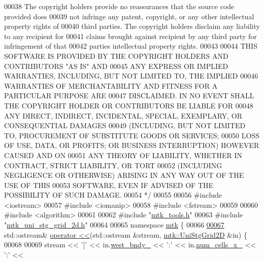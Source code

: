 \begin{DoxyCode}
00038 \textcolor{comment}{The copyright holders provide no reassurances that the source code provided does}
00039 \textcolor{comment}{not infringe any patent, copyright, or any other intellectual property rights of}
00040 \textcolor{comment}{third parties. The copyright holders disclaim any liability to any recipient for}
00041 \textcolor{comment}{claims brought against recipient by any third party for infringement of that}
00042 \textcolor{comment}{parties intellectual property rights.}
00043 \textcolor{comment}{}
00044 \textcolor{comment}{THIS SOFTWARE IS PROVIDED BY THE COPYRIGHT HOLDERS AND CONTRIBUTORS "AS IS" AND}
00045 \textcolor{comment}{ANY EXPRESS OR IMPLIED WARRANTIES, INCLUDING, BUT NOT LIMITED TO, THE IMPLIED}
00046 \textcolor{comment}{WARRANTIES OF MERCHANTABILITY AND FITNESS FOR A PARTICULAR PURPOSE ARE}
00047 \textcolor{comment}{DISCLAIMED. IN NO EVENT SHALL THE COPYRIGHT HOLDER OR CONTRIBUTORS BE LIABLE FOR}
00048 \textcolor{comment}{ANY DIRECT, INDIRECT, INCIDENTAL, SPECIAL, EXEMPLARY, OR CONSEQUENTIAL DAMAGES}
00049 \textcolor{comment}{(INCLUDING, BUT NOT LIMITED TO, PROCUREMENT OF SUBSTITUTE GOODS OR SERVICES;}
00050 \textcolor{comment}{LOSS OF USE, DATA, OR PROFITS; OR BUSINESS INTERRUPTION) HOWEVER CAUSED AND ON}
00051 \textcolor{comment}{ANY THEORY OF LIABILITY, WHETHER IN CONTRACT, STRICT LIABILITY, OR TORT}
00052 \textcolor{comment}{(INCLUDING NEGLIGENCE OR OTHERWISE) ARISING IN ANY WAY OUT OF THE USE OF THIS}
00053 \textcolor{comment}{SOFTWARE, EVEN IF ADVISED OF THE POSSIBILITY OF SUCH DAMAGE.}
00054 \textcolor{comment}{*/}
00055 
00056 \textcolor{preprocessor}{#include <iostream>}
00057 \textcolor{preprocessor}{#include <iomanip>}
00058 \textcolor{preprocessor}{#include <fstream>}
00059 
00060 \textcolor{preprocessor}{#include <algorithm>}
00061 
00062 \textcolor{preprocessor}{#include "\hyperlink{mtk__tools_8h}{mtk\_tools.h}"}
00063 \textcolor{preprocessor}{#include "\hyperlink{mtk__uni__stg__grid__2d_8h}{mtk\_uni\_stg\_grid\_2d.h}"}
00064 
00065 \textcolor{keyword}{namespace }\hyperlink{namespacemtk}{mtk} \{
00066 
\hypertarget{mtk__uni__stg__grid__2d_8cc_source_l00067}{}\hyperlink{namespacemtk_a82cd99c0c7e695e4eccfbe7380525959}{00067} std::ostream& \hyperlink{namespacemtk_ad3bcf52cda59ddb5fc7b4bdce76c46dc}{operator <<}(std::ostream &stream, \hyperlink{classmtk_1_1UniStgGrid2D}{mtk::UniStgGrid2D} &in) \{
00068 
00069   stream << \textcolor{charliteral}{'['} << in.\hyperlink{classmtk_1_1UniStgGrid2D_a59c42d8099a017bc8a082fddc1e5606c}{west\_bndy\_} << \textcolor{charliteral}{':'} << in.\hyperlink{classmtk_1_1UniStgGrid2D_ac03a0f4840ee6ae1bc853e5d9c0df8d1}{num\_cells\_x\_} << \textcolor{charliteral}{':'} <<

\end{DoxyCode}

